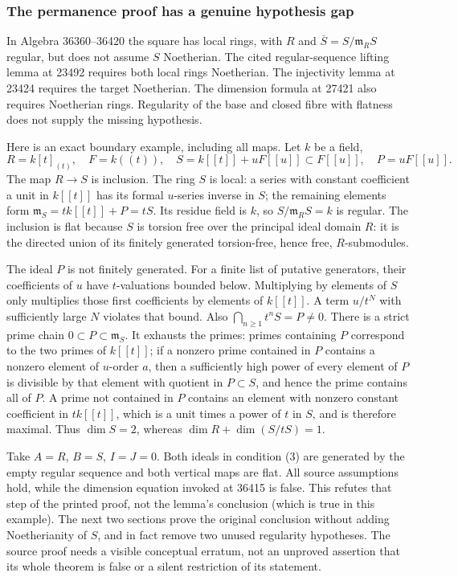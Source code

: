 \subsubsection{The permanence proof has a genuine hypothesis gap}\label{algebra-proof-045-the-permanence-proof-has-a-genuine-hypothesis-gap}

In Algebra 36360--36420 the square has local rings, with \(R\) and \(\overline S=S/\mathfrak m_RS\) regular, but does not assume \(S\) Noetherian. The cited regular-sequence lifting lemma at 23492 requires both local rings Noetherian. The injectivity lemma at 23424 requires the target Noetherian. The dimension formula at 27421 also requires Noetherian rings. Regularity of the base and closed fibre with flatness does not supply the missing hypothesis.

Here is an exact boundary example, including all maps. Let \(k\) be a field, \[
R=k[t]_{(t)},\quad F=k((t)),\quad
S=k[[t]]+uF[[u]]\subset F[[u]],\quad P=uF[[u]].
\] The map \(R\to S\) is inclusion. The ring \(S\) is local: a series with constant coefficient a unit in \(k[[t]]\) has its formal \(u\)-series inverse in \(S\); the remaining elements form \(\mathfrak m_S=tk[[t]]+P=tS\). Its residue field is \(k\), so \(S/\mathfrak m_RS=k\) is regular. The inclusion is flat because \(S\) is torsion free over the principal ideal domain \(R\): it is the directed union of its finitely generated torsion-free, hence free, \(R\)-submodules.

The ideal \(P\) is not finitely generated. For a finite list of putative generators, their coefficients of \(u\) have \(t\)-valuations bounded below. Multiplying by elements of \(S\) only multiplies those first coefficients by elements of \(k[[t]]\). A term \(u/t^N\) with sufficiently large \(N\) violates that bound. Also \(\bigcap_{n\geq1}t^nS=P\ne0\). There is a strict prime chain \(0\subset P\subset\mathfrak m_S\). It exhausts the primes: primes containing \(P\) correspond to the two primes of \(k[[t]]\); if a nonzero prime contained in \(P\) contains a nonzero element of \(u\)-order \(a\), then a sufficiently high power of every element of \(P\) is divisible by that element with quotient in \(P\subset S\), and hence the prime contains all of \(P\). A prime not contained in \(P\) contains an element with nonzero constant coefficient in \(tk[[t]]\), which is a unit times a power of \(t\) in \(S\), and is therefore maximal. Thus \(\dim S=2\), whereas \(\dim R+\dim(S/tS)=1\).

Take \(A=R\), \(B=S\), \(I=J=0\). Both ideals in condition (3) are generated by the empty regular sequence and both vertical maps are flat. All source assumptions hold, while the dimension equation invoked at 36415 is false. This refutes that step of the printed proof, not the lemma's conclusion (which is true in this example). The next two sections prove the original conclusion without adding Noetherianity of \(S\), and in fact remove two unused regularity hypotheses. The source proof needs a visible conceptual erratum, not an unproved assertion that its whole theorem is false or a silent restriction of its statement.

